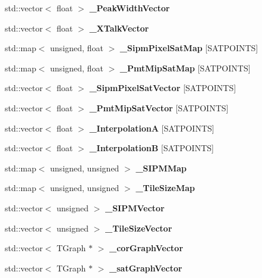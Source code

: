 \begin{DoxyCompactItemize}
\item 
std::vector$<$ float $>$ {\bfseries \_\-PeakWidthVector}\label{classCALICE_1_1SiPmPropertiesProcessor_ac51ad1f3b42c8d4e6ed22a578cab93e1}

\item 
std::vector$<$ float $>$ {\bfseries \_\-XTalkVector}\label{classCALICE_1_1SiPmPropertiesProcessor_aaed7eb60832cf27397c07d29f02b3655}

\item 
std::map$<$ unsigned, float $>$ {\bfseries \_\-SipmPixelSatMap} [SATPOINTS]\label{classCALICE_1_1SiPmPropertiesProcessor_aac2e9c79a36b6b8a2142f90a43d49ac0}

\item 
std::map$<$ unsigned, float $>$ {\bfseries \_\-PmtMipSatMap} [SATPOINTS]\label{classCALICE_1_1SiPmPropertiesProcessor_af66eeb8207a9f06138ebdd3691ca87b3}

\item 
std::vector$<$ float $>$ {\bfseries \_\-SipmPixelSatVector} [SATPOINTS]\label{classCALICE_1_1SiPmPropertiesProcessor_a7ffbe1262a0e69b16409c0a0b6f6d7dc}

\item 
std::vector$<$ float $>$ {\bfseries \_\-PmtMipSatVector} [SATPOINTS]\label{classCALICE_1_1SiPmPropertiesProcessor_ab16b4671505857cddbd7bed4e0976677}

\item 
std::vector$<$ float $>$ {\bfseries \_\-InterpolationA} [SATPOINTS]\label{classCALICE_1_1SiPmPropertiesProcessor_acba8a855860b9dcf60e7d2af825f6ffb}

\item 
std::vector$<$ float $>$ {\bfseries \_\-InterpolationB} [SATPOINTS]\label{classCALICE_1_1SiPmPropertiesProcessor_a6140eb844de35c9d12005f07ca703bf2}

\item 
std::map$<$ unsigned, unsigned $>$ {\bfseries \_\-SIPMMap}\label{classCALICE_1_1SiPmPropertiesProcessor_a74ce5786f56b407136f1296c52186217}

\item 
std::map$<$ unsigned, unsigned $>$ {\bfseries \_\-TileSizeMap}\label{classCALICE_1_1SiPmPropertiesProcessor_a2809f9f20605f6b9e45413fdd366acc8}

\item 
std::vector$<$ unsigned $>$ {\bfseries \_\-SIPMVector}\label{classCALICE_1_1SiPmPropertiesProcessor_a4b3c0339d341c2644acd956c3c94ae30}

\item 
std::vector$<$ unsigned $>$ {\bfseries \_\-TileSizeVector}\label{classCALICE_1_1SiPmPropertiesProcessor_ae794aaa1cbba31e6b41928f2c39c2110}

\item 
std::vector$<$ TGraph $\ast$ $>$ {\bfseries \_\-corGraphVector}\label{classCALICE_1_1SiPmPropertiesProcessor_a05341072000f27ed32a970efa463dfaf}

\item 
std::vector$<$ TGraph $\ast$ $>$ {\bfseries \_\-satGraphVector}\label{classCALICE_1_1SiPmPropertiesProcessor_ac6fda8c85d1d6883fa424c7d19c26b1c}

\end{DoxyCompactItemize}


